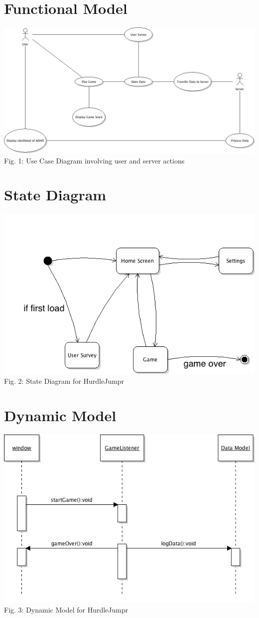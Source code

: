 \documentclass[a4wide]{article}
\begin{document}
\section{Functional Model}
\includegraphics[width=\textwidth]{images/UseCaseDiagram.png}
\small Fig. 1: Use Case Diagram involving user and server actions
\section{State Diagram}
\includegraphics[width=\textwidth]{images/StateDiagram.png}
Fig. 2: State Diagram for HurdleJumpr

\section{Dynamic Model}
\includegraphics[width=\textwidth]{images/dynamicModel.png}
Fig. 3: Dynamic Model for HurdleJumpr
\end{document}
